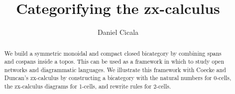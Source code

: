 \documentclass[submission,copyright,creativecommons]{eptcs}
\title{Categorifying the zx-calculus}
\author{Daniel Cicala
\institute{University of California, Riverside}
\institute{Department of Mathematics}
\email{cicala@math.ucr.edu}
}
\begin{document}

\maketitle

\begin{abstract}
	We build a symmetric monoidal and 
	compact closed bicategory
	by combining spans and cospans
	inside a topos.
	This can be used as a framework
	in which to study open networks 
	and diagrammatic languages.
	We illustrate this framework with
	Coecke and Duncan's zx-calculus
	by constructing a bicategory with 
	the natural numbers for 0-cells,
	the zx-calculus diagrams for 1-cells, and
	rewrite rules for 2-cells. 
\end{abstract}

%
%








\appendix


\nocite{*}


 
\end{document}
